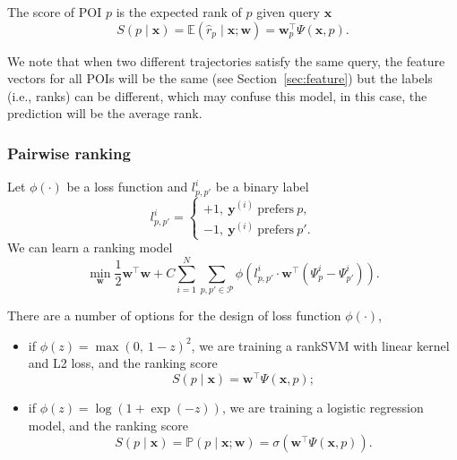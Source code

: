 \documentclass[9pt]{extarticle}
\begin{document}
The score of POI $p$ is the expected rank of $p$ given query $\mathbf{x}$ 
\begin{equation*}
S(p \mid \mathbf{x})
= \mathbb{E}(\hat{r}_p \mid \mathbf{x}; \mathbf{w}) 
= \mathbf{w}_p^\top \Psi(\mathbf{x}, p).
\end{equation*}


We note that when two different trajectories satisfy the same query, the feature vectors for all POIs will be the same (see Section~\ref{sec:feature})
but the labels (i.e., ranks) can be different, which may confuse this model, in this case, the prediction will be the average rank.



\subsubsection{Pairwise ranking}
\label{sec:rank}

Let $\phi(\cdot)$ be a loss function and $l_{p,p'}^i$ be a binary label
\begin{equation*}
l_{p,p'}^i = \begin{cases}
+1,~ \mathbf{y}^{(i)} ~\text{prefers}~ p, \\
-1,~ \mathbf{y}^{(i)} ~\text{prefers}~ p'.
\end{cases}
\end{equation*}
We can learn a ranking model
\begin{equation*}
\min_{\mathbf{w}} \frac{1}{2} \mathbf{w}^\top \mathbf{w} +  
C \sum_{i=1}^N \sum_{p, p' \in \mathcal{P}} \phi \left( l_{p,p'}^i \cdot \mathbf{w}^\top \left( \Psi_p^i - \Psi_{p'}^i \right) \right).
\end{equation*}

There are a number of options for the design of loss function $\phi(\cdot)$,
\begin{itemize}
\item if $\phi(z) = \max(0,~ 1-z)^2$, we are training a rankSVM with linear kernel and L2 loss, and the ranking score 
      \begin{equation*}
      S(p \mid \mathbf{x})= \mathbf{w}^\top \Psi(\mathbf{x}, p);
      \end{equation*}
\item if $\phi(z) = \log(1 + \exp(-z))$, we are training a logistic regression model, and the ranking score
      \begin{equation*}
      S(p \mid \mathbf{x})= \mathbb{P}(p \mid \mathbf{x}; \mathbf{w}) = \sigma \left(\mathbf{w}^\top \Psi(\mathbf{x}, p) \right).
      \end{equation*}
\end{itemize}
\end{document}
